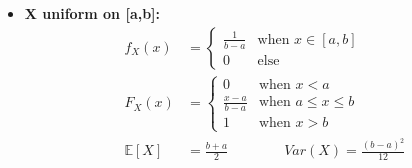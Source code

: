 \documentclass[10pt]{article}
\begin{document}
\begin{multicols}{2}
\begin{itemize}
\item \textbf{X uniform on [a,b]:}
  \begin{equation*}
    \boxed{
      \begin{aligned}
        f_X(x) &=
        \begin{cases}
          \frac{1}{b-a} & \text{when } x \in [a,b] \\
          0 & \text{else}
        \end{cases} \\
        F_X(x) &=
        \begin{cases}
          0 & \text{when } x < a \\
          \frac{x-a}{b-a} & \text{when } a\leq x\leq b \\
          1 & \text{when } x > b
        \end{cases} \\
        \mathbb{E}[X] &= \frac{b+a}{2} \qquad \qquad
        Var(X) = \frac{(b-a)^2}{12}
      \end{aligned}
    }
  \end{equation*}




\end{itemize}
\end{multicols}
\end{document}
